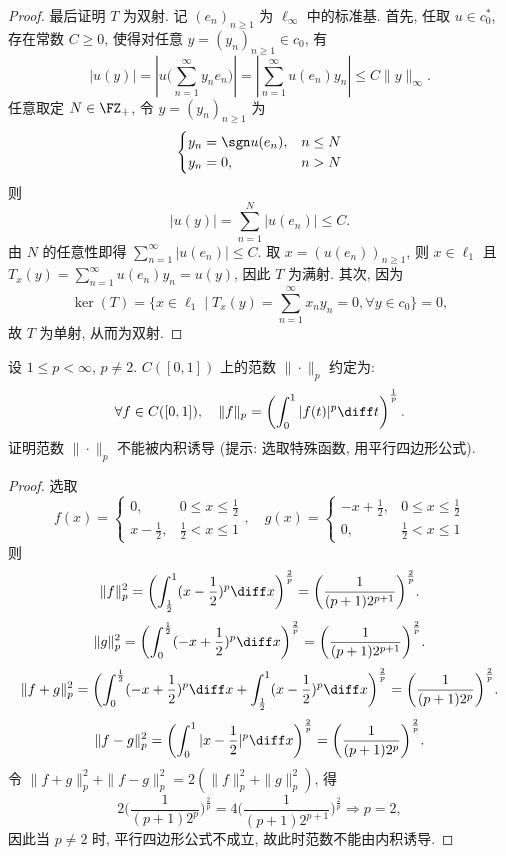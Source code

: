 \documentclass{mathexercise}
\begin{document}
\begin{proof}
    最后证明 $T$ 为双射. 记 $(e_n)_{n\geq 1}$ 为 $\ell_{\infty}$
    中的标准基. 首先, 任取 $u\in c_0^*$, 存在常数 $C\geq 0$, 使得对任意 $y=(y_n)_{n\geq 1}\in c_0$, 有
    \[|u(y)|=\left|u\biggl(\sum_{n=1}^{\infty}y_ne_n\biggr)\right|=\left|\sum_{n=1}^{\infty}u(e_n)y_n\right|\leq C\|y\|_{\infty}.\]
    任意取定 $N\in\FZ_+$, 令 $y=(y_n)_{n\geq 1}$ 为
    \[\begin{cases}
        y_n=\sgn u(e_n), & n\leq N \\
        y_n=0,           & n>N
    \end{cases}\]
    则
    \[|u(y)|=\sum_{n=1}^N |u(e_n)|\leq C.\]
    由 $N$ 的任意性即得 $\sum_{n=1}^{\infty}|u(e_n)|\leq C$.
    取 $x=(u(e_n))_{n\geq 1}$, 则 $x\in\ell_1$ 且 $T_x(y)=\sum_{n=1}^{\infty}u(e_n)y_n=u(y)$,
    因此 $T$ 为满射. 其次, 因为
    \[\ker(T)=\{x\in\ell_1\mid T_x(y)=\sum_{n=1}^{\infty}x_ny_n=0,\forall y\in c_0\}=0,\]
    故 $T$ 为单射, 从而为双射.
\end{proof}



\begin{exercise}
    设 $1\leq p<\infty$, $p\neq 2$. $C([0,1])$ 上的范数 $\|\cdot\|_{p}$ 约定为:
    \[
    \forall f \in C([0,1]), \quad\|f\|_{p}=\left(\int_{0}^{1}|f(t)|^{p}\diff t\right)^{\frac{1}{p}}.
    \]
    证明范数 $\|\cdot\|_{p}$ 不能被内积诱导 (提示: 选取特殊函数, 用平行四边形公式).
\end{exercise}

\begin{proof}
    选取
    \[f(x)=\begin{cases}
        0, & 0\leq x\leq\frac{1}{2} \\
        x-\frac{1}{2}, & \frac{1}{2}<x\leq 1
    \end{cases},\quad
    g(x)=\begin{cases}
        -x+\frac{1}{2}, & 0\leq x\leq\frac{1}{2} \\
        0, & \frac{1}{2}<x\leq 1
    \end{cases}\]
    则
    \[\|f\|_p^2=\biggl(\int_{\frac{1}{2}}^1 (x-\frac{1}{2})^p\diff x\biggr)^{\frac{2}{p}}=\biggl(\frac{1}{(p+1)2^{p+1}}\biggr)^{\frac{2}{p}}.\]
    \[\|g\|_p^2=\biggl(\int_0^{\frac{1}{2}} (-x+\frac{1}{2})^p\diff x\biggr)^{\frac{2}{p}}=\biggl(\frac{1}{(p+1)2^{p+1}}\biggr)^{\frac{2}{p}}.\]
    \[\|f+g\|_p^2=\biggl(\int_0^{\frac{1}{2}}(-x+\frac{1}{2})^p\diff x+\int_{\frac{1}{2}}^1 (x-\frac{1}{2})^p\diff x\biggr)^{\frac{2}{p}}=\biggl(\frac{1}{(p+1)2^p}\biggr)^{\frac{2}{p}}.\]
    \[\|f-g\|_p^2=\biggl(\int_0^1 |x-\frac{1}{2}|^p\diff x\biggr)^{\frac{2}{p}}=\biggl(\frac{1}{(p+1)2^p}\biggr)^{\frac{2}{p}}.\]
    令 $\|f+g\|_p^2+\|f-g\|_p^2=2(\|f\|_p^2+\|g\|_p^2)$, 得
    \[2\biggl(\frac{1}{(p+1)2^p}\biggr)^{\frac{2}{p}}=4\biggl(\frac{1}{(p+1)2^{p+1}}\biggr)^{\frac{2}{p}}\Rightarrow p=2,\]
    因此当 $p\neq 2$ 时, 平行四边形公式不成立, 故此时范数不能由内积诱导.
\end{proof}
\end{document}
